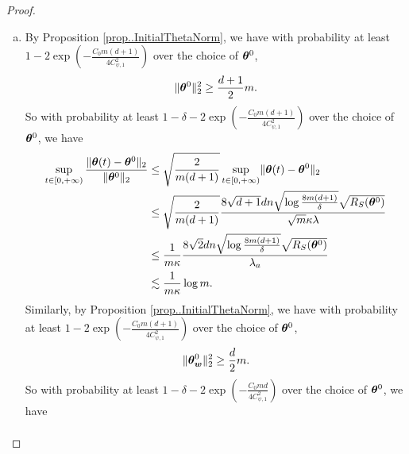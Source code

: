 \documentclass[twoside,11pt]{article}
\begin{document}
\begin{proof}
\begin{enumerate}[(a)]
\begin{enumerate}[(i)]
\begin{equation*}
                        \end{equation*}
                        Suppose that $t^*_a<+\infty$ then one can take the limit $t\to t^*_a$ in~\eqref{thm-proof:w-step1}. This will lead to a contradiction with the definition of $t^*_a$. Therefore $t^*_a=+\infty$.
              \end{enumerate}
        \item By Proposition \ref{prop..InitialThetaNorm}, we have with probability at least $1-2\exp(-\frac{C_0m(d+1)}{4C_{\psi,1}^2})$ over the choice of $\bm{\theta}^0$,
              \begin{equation*}
                  \lVert\bm{\theta}^0\rVert^2_2\geq\frac{d+1}{2}m.
              \end{equation*}
              So with probability at least $1-\delta-2\exp\left(-\frac{C_0m(d+1)}{4C^2_{\psi,1}}\right)$ over the choice of $\bm{\theta}^0$, we have
              \begin{equation*}
                  \begin{aligned}
                      \sup\limits_{t\in[0,+\infty)}\frac{\lVert\bm{\theta}(t)-\bm{\theta}^0\rVert_2}{\lVert\bm{\theta}^0\rVert_2}
                       & \leq \sqrt{\frac{2}{m(d+1)}}\sup\limits_{t\in[0,+\infty)}\lVert\bm{\theta}(t)-\bm{\theta}^0\rVert_2                                          \\
                       & \leq  \sqrt{\frac{2}{m(d+1)}} \frac{8\sqrt{d+1}dn\sqrt{\log\frac{8m(d+1)}{\delta}}\sqrt{R_S(\bm{\theta}^0)}}{\sqrt{m}\kappa\lambda} \\
                       & \leq \frac{1}{m\kappa}\frac{8\sqrt{2}dn\sqrt{\log\frac{8m(d+1)}{\delta}}\sqrt{R_S(\bm{\theta}^0)}}{\lambda_a}                       \\
                       & \lesssim \frac{1}{m\kappa}\log m.
                  \end{aligned}
              \end{equation*}
              Similarly, by Proposition \ref{prop..InitialThetaNorm}, we have with probability at least $1-2\exp(-\frac{C_0m(d+1)}{4C_{\psi,1}^2})$ over the choice of $\bm{\theta}^0$,
              \begin{equation*}
                  \lVert\bm{\theta}_{\bm{w}}^0\rVert^2_2\geq\frac{d}{2}m.
              \end{equation*}
              So with probability at least $1-\delta-2\exp\left(-\frac{C_0md}{4C^2_{\psi,1}}\right)$ over the choice of $\bm{\theta}^0$, we have
              \begin{equation*}
                  \begin{aligned}

\end{aligned}
\end{equation*}
\end{enumerate}
\end{proof}
\end{document}
